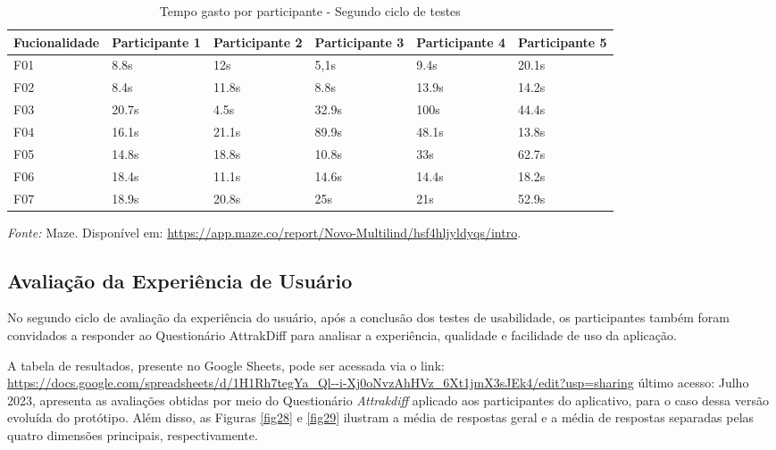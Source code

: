 \begin{table}[h!]
	\centering
	\caption{Tempo gasto por participante - Segundo ciclo de testes}
	\label{tab07}
	\begin{adjustbox}{center}
	\begin{tabular}{l|l|l|l|l|l}
	\hline
	Fucionalidade & Participante 1 & Participante 2 & Participante 3 & Participante 4 & Participante 5 \\ 	\hline
	F01                   & 8.8s     & 12s     & 5,1s      & 9.4s       & 20.1s      \\
	F02                   & 8.4s        & 11.8s      & 8.8s      & 13.9s    & 14.2s     \\
	F03                   & 20.7s        & 4.5s      & 32.9s      & 100s     & 44.4s     \\
	F04                   & 16.1s        & 21.1s     & 89.9s     & 48.1s     & 13.8s     \\
	F05                   & 14.8s      & 18.8s      & 10.8s     & 33s     & 62.7s     \\
	F06                   & 18.4s     & 11.1s      & 14.6s     & 14.4s     & 18.2s     \\
	F07                   & 18.9s     & 20.8s      & 25s     & 21s    & 52.9s       \\ 	\hline
	\end{tabular}
	\end{adjustbox}
	\begin{tablenotes}[flushleft]
		\centering
		\item \textit{Fonte:} Maze. Disponível em: \url{https://app.maze.co/report/Novo-Multilind/hsf4hljyldyqs/intro}.
	  \end{tablenotes}
\end{table}

\subsection{Avaliação da Experiência de Usuário}
\label{sec:Segunda Avaliação da Experiência de Usuário}
No segundo ciclo de avaliação da experiência do usuário, após a conclusão dos testes de usabilidade, os participantes também foram convidados a responder ao Questionário AttrakDiff para analisar a experiência, qualidade e facilidade de uso da aplicação.

A tabela de resultados, presente no Google Sheets, pode ser acessada via o link: 
\url{https://docs.google.com/spreadsheets/d/1H1Rh7tegYa_Ql--i-Xj0oNvzAhHVz_6Xt1jmX3sJEk4/edit?usp=sharing} último acesso: Julho 2023, apresenta as avaliações obtidas por meio do Questionário \textit{Attrakdiff} aplicado aos participantes do aplicativo, para o caso 
dessa versão evoluída do protótipo. Além disso, as Figuras \ref{fig28} e \ref{fig29} ilustram a média de respostas geral e a média de respostas separadas pelas quatro dimensões principais, respectivamente.

